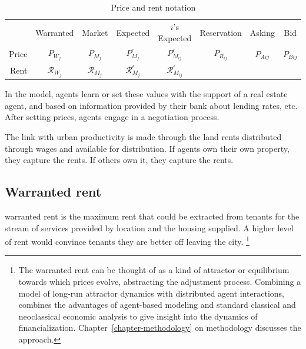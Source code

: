 \begin{table}[!ht]
\centering
{\renewcommand{\arraystretch}{1.6}
\begin{tabular}{r|c|c|c|c|c|c|c|}\cline{2-8}
       & Warranted  & Market & Expected & $i$'s Expected & Reservation & Asking & Bid     \\ \cline{2-8}
Price  & $P_{W_j}$      & $P_{M_j}$  & $P_{M_j}^\epsilon$ & $P_{M_{ij}}^{\epsilon}$     & $P_{R_{ij}}$       & $P_{A{ij}}$  & $P_{B{ij}}$   \\ \cline{2-8}
Rent  & $\mathcal{R}_{W_j}$      & $\mathcal{R}_{M_j}$  & $\mathcal{R}_{M_j}^\epsilon$ & $\mathcal{R}_{M_{ij}}^{\epsilon}$     &       &   &   \\ \cline{2-8}
\end{tabular}
 }   

\caption{Price and rent notation}
\label{table-price-notation}
\end{table}



In the model, agents learn or set these values with the support of a real estate agent, and based on information provided by their bank about lending rates, etc. After setting prices, agents engage in a negotiation process. 

The link with urban productivity is made through the land rents distributed through wages and available for distribution. If agents own their own property, they capture the rents. If others own it, they capture the rents.

\subsection{Warranted rent} \label{section-waranted-rent}
\Gls{warranted rent} is the maximum rent that could be extracted from tenants for the stream of services provided by location and the housing supplied. A higher level of rent would convince tenants they are better off leaving the city.
\footnote{The warranted rent can be thought of as a kind of \gls{attractor} or \gls{equilibrium} towards which prices evolve, abstracting %
the adjustment process. %
Combining a model of long-run attractor dynamics with distributed agent interactions, combines the advantages of agent-based modeling and standard \gls{classical} and \gls{neoclassical} economic analysis to give insight into the dynamics of financialization. Chapter~\ref{chapter-methodology} on methodology discusses the approach.} 

